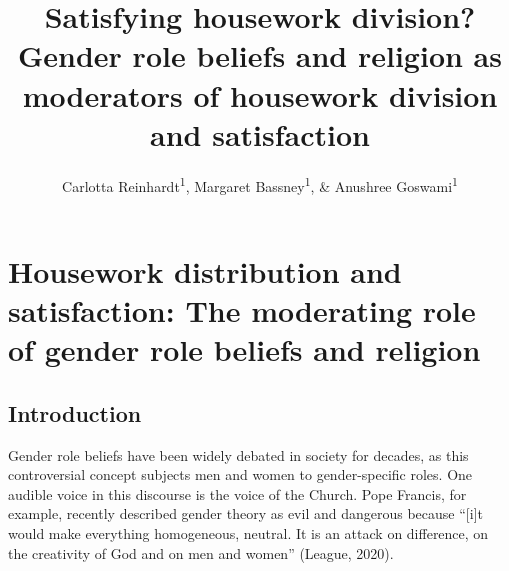 \documentclass[
  man,floatsintext]{apa6}
\title{Satisfying housework division? Gender role beliefs and religion as moderators of housework division and satisfaction}
\author{Carlotta Reinhardt\textsuperscript{1}, Margaret Bassney\textsuperscript{1}, \& Anushree Goswami\textsuperscript{1}}
\date{}
\affiliation{\vspace{0.5cm}\textsuperscript{1} Smith College}
\begin{document}
\maketitle

\hypertarget{housework-distribution-and-satisfaction-the-moderating-role-of-gender-role-beliefs-and-religion}{%
\section{Housework distribution and satisfaction: The moderating role of gender role beliefs and religion}\label{housework-distribution-and-satisfaction-the-moderating-role-of-gender-role-beliefs-and-religion}}

\hypertarget{introduction}{%
\subsection{Introduction}\label{introduction}}

Gender role beliefs have been widely debated in society for decades, as this controversial concept subjects men and women to gender-specific roles. One audible voice in this discourse is the voice of the Church. Pope Francis, for example, recently described gender theory as evil and dangerous because ``{[}i{]}t would make everything homogeneous, neutral. It is an attack on difference, on the creativity of God and on men and women'' (League, 2020).
\end{document}
